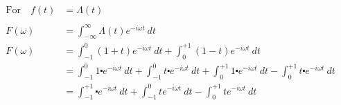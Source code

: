 \documentclass[preview]{standalone}
\begin{document}
\begin{align*}
\textrm{For} \quad f(t)&=\Lambda(t) \\ \\ F(\omega)&=\int_{-\infty}^{\infty}\Lambda(t)e^{-i\omega t} \ dt \\ F(\omega)&=\int_{-1}^{0}(1+t)e^{-i\omega t} \ dt+\int_{0}^{+1}(1-t)e^{-i\omega t} \ dt \\ &=\int_{-1}^{0}1\centerdot e^{-i\omega t} \ dt+\int_{-1}^{0}t\centerdot e^{-i\omega t} \ dt+\int_{0}^{+1}1\centerdot e^{-i\omega t} \ dt-\int_{0}^{+1}t\centerdot e^{-i\omega t} \ dt \\ &=\int_{-1}^{+1}\centerdot e^{-i\omega t} \ dt+\int_{-1}^{0}t e^{-i\omega t} \ dt-\int_{0}^{+1}t e^{-i\omega t} \ dt
\end{align*}
\end{document}
